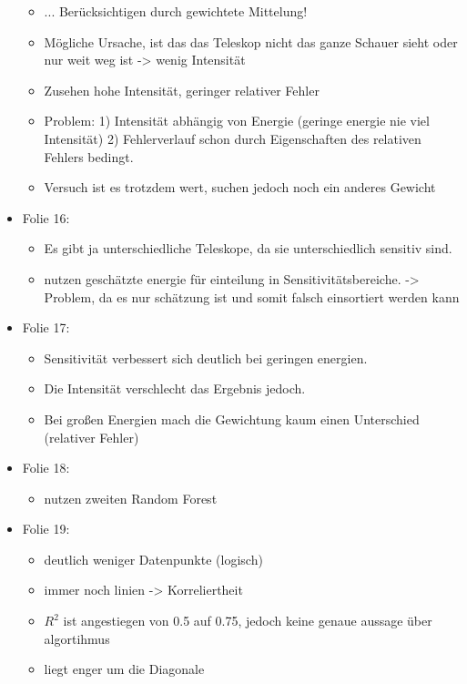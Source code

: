 \documentclass[
  bibliography=totoc,     %
  captions=tableheading,  %
  titlepage=firstiscover, %
]{scrartcl}
\begin{document}
\begin{itemize}
      \begin{itemize}
        \item ... Berücksichtigen durch gewichtete Mittelung!
        \item Mögliche Ursache, ist das das Teleskop nicht das ganze Schauer sieht oder nur weit weg ist -> wenig Intensität
        \item Zusehen hohe Intensität, geringer relativer Fehler
        \item Problem: 1) Intensität abhängig von Energie (geringe energie nie viel Intensität) 2) Fehlerverlauf schon durch Eigenschaften des relativen
              Fehlers bedingt.
        \item Versuch ist es trotzdem wert, suchen jedoch noch ein anderes Gewicht
      \end{itemize}
    \item Folie 16:
      \begin{itemize}
        \item Es gibt ja unterschiedliche Teleskope, da sie unterschiedlich sensitiv sind.
        \item nutzen geschätzte energie für einteilung in Sensitivitätsbereiche. -> Problem, da es nur schätzung ist und somit falsch einsortiert werden kann
      \end{itemize}
    \item Folie 17:
      \begin{itemize}
        \item Sensitivität verbessert sich deutlich bei geringen energien.
        \item Die Intensität verschlecht das Ergebnis jedoch.
        \item Bei großen Energien mach die Gewichtung kaum einen Unterschied (relativer Fehler)
      \end{itemize}
    \item Folie 18:
      \begin{itemize}
        \item nutzen zweiten Random Forest
      \end{itemize}
    \item Folie 19:
      \begin{itemize}
        \item deutlich weniger Datenpunkte (logisch)
        \item immer noch linien -> Korreliertheit
        \item $R^2$ ist angestiegen von 0.5 auf 0.75, jedoch keine genaue aussage über algortihmus
        \item liegt enger um die Diagonale

\end{itemize}
\end{itemize}
\end{document}
